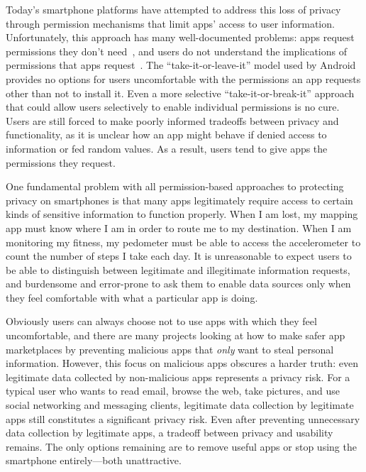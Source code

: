 Today's smartphone platforms have attempted to address this loss of privacy
through permission mechanisms that limit apps' access to user information.
Unfortunately, this approach has many well-documented problems: apps request
permissions they don't need~\cite{taintdroid-osdi,demystified-ccs11}, and
users do not understand the implications of permissions that apps
request~\cite{androidperms-soups12}. The ``take-it-or-leave-it'' model used
by Android provides no options for users uncomfortable with the permissions
an app requests other than not to install it. Even a more selective
``take-it-or-break-it'' approach~\cite{apex-asiaccs10} that could allow users
selectively to enable individual permissions is no cure.  Users are still
forced to make poorly informed tradeoffs between privacy and functionality,
as it is unclear how an app might behave if denied access to information or
fed random values. As a result, users tend to give apps the permissions they
request.


One fundamental problem with all permission-based approaches to protecting
privacy on smartphones is that many apps legitimately require access to
certain kinds of sensitive information to function properly. When I am lost,
my mapping app must know where I am in order to route me to my destination.
When I am monitoring my fitness, my pedometer must be able to access the
accelerometer to count the number of steps I take each day. It is
unreasonable to expect users to be able to distinguish between legitimate and
illegitimate information requests, and burdensome and error-prone to ask them
to enable data sources only when they feel comfortable with what a particular
app is doing.

Obviously users can always choose not to use apps with which they feel
uncomfortable, and there are many projects looking at how to make safer app
marketplaces by preventing malicious apps that \textit{only} want to steal
personal information. However, this focus on malicious apps obscures a harder
truth: even legitimate data collected by non-malicious apps represents a
privacy risk. For a typical user who wants to read email, browse the web,
take pictures, and use social networking and messaging clients, legitimate
data collection by legitimate apps still constitutes a significant privacy
risk. Even after preventing unnecessary data collection by legitimate apps, a
tradeoff between privacy and usability remains. The only options remaining
are to remove useful apps or stop using the smartphone entirely---both
unattractive.


